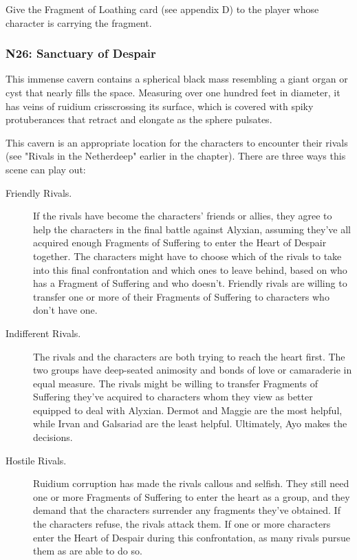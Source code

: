 \documentclass[10pt,a4paper,twoside,fancy,bg=print,twocolumn,openany,nodeprecatedcode]{dndbook}
\begin{document}
Give the Fragment of Loathing card (see appendix D) to the player whose character is carrying the fragment.

\subsubsection{N26: Sanctuary of Despair}
\begin{DndReadAloud}{}
This immense cavern contains a spherical black mass resembling a giant organ or cyst that nearly fills the space. Measuring over one hundred feet in diameter, it has veins of ruidium crisscrossing its surface, which is covered with spiky protuberances that retract and elongate as the sphere pulsates.

\end{DndReadAloud}

This cavern is an appropriate location for the characters to encounter their rivals (see "Rivals in the Netherdeep" earlier in the chapter). There are three ways this scene can play out:


\begin{description}
\item[Friendly Rivals.]
If the rivals have become the characters' friends or allies, they agree to help the characters in the final battle against Alyxian, assuming they've all acquired enough Fragments of Suffering to enter the Heart of Despair together. The characters might have to choose which of the rivals to take into this final confrontation and which ones to leave behind, based on who has a Fragment of Suffering and who doesn't. Friendly rivals are willing to transfer one or more of their Fragments of Suffering to characters who don't have one.
\item[Indifferent Rivals.]
The rivals and the characters are both trying to reach the heart first. The two groups have deep-seated animosity and bonds of love or camaraderie in equal measure. The rivals might be willing to transfer Fragments of Suffering they've acquired to characters whom they view as better equipped to deal with Alyxian. Dermot and Maggie are the most helpful, while Irvan and Galsariad are the least helpful. Ultimately, Ayo makes the decisions.
\item[Hostile Rivals.]
Ruidium corruption has made the rivals callous and selfish. They still need one or more Fragments of Suffering to enter the heart as a group, and they demand that the characters surrender any fragments they've obtained. If the characters refuse, the rivals attack them. If one or more characters enter the Heart of Despair during this confrontation, as many rivals pursue them as are able to do so.
\end{description}
\end{document}

